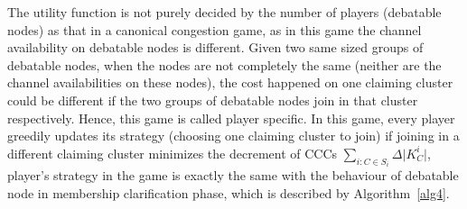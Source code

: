 \begin{itemize}
The utility function is not purely decided by the number of players (debatable nodes) as that in a canonical congestion game, as in this game the channel availability on debatable nodes is different.
Given two same sized groups of debatable nodes, when the nodes are not completely the same (neither are the channel availabilities on these nodes), the cost happened on one claiming cluster could be different if the two groups of debatable nodes join in that cluster respectively.
Hence, this game is called player specific.
In this game, every player greedily updates its strategy (choosing one claiming cluster to join) if joining in a different claiming cluster minimizes the decrement of CCCs $\sum_{i:C\in S_i} \Delta\vert K^i_C \vert$, player's strategy in the game is exactly the same with the behaviour of debatable node in membership clarification phase, which is described by Algorithm~\ref{alg4}.




\end{itemize}


